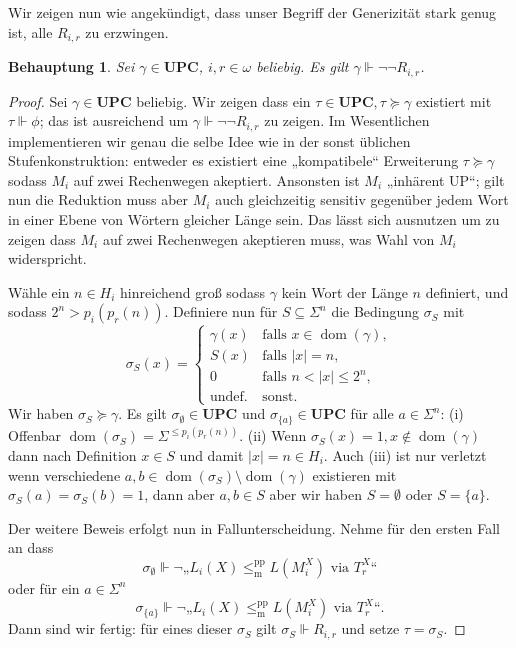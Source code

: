\documentclass[nofonts]{uebung}
\newtheorem{claim}[theorem]{Behauptung}
\theoremstyle{definition}
\DeclareMathOperator{\dom}{dom}
\def\leqmpp{\ensuremath{\leq_\mathrm{m}^\mathrm{pp}}}
\begin{document}
Wir zeigen nun wie angekündigt, dass unser Begriff der Generizität stark genug ist, alle $R_{i,r}$ zu erzwingen.
\begin{claim}\label{claim:upc-stark-genug}
    Sei $\gamma\in\mathbf{UPC}$, $i,r\in\omega$ beliebig. Es gilt $\gamma\Vdash\neg\neg   R_{i,r}$.
\end{claim}
\begin{proof}
    Sei $\gamma\in\mathbf{UPC}$ beliebig. Wir zeigen dass ein $\tau\in\mathbf{UPC}, \tau\succeq \gamma$ existiert mit $\tau\Vdash\phi$;
    das ist ausreichend um $\gamma\Vdash\neg\neg   R_{i,r}$ zu zeigen.
    Im Wesentlichen implementieren wir genau die selbe Idee wie in der sonst üblichen Stufenkonstruktion: entweder es existiert eine „kompatibele“ Erweiterung $\tau\succeq \gamma$ sodass $M_i$ auf zwei Rechenwegen akeptiert. Ansonsten ist $M_i$ „inhärent UP“; gilt nun die Reduktion muss aber $M_i$ auch gleichzeitig sensitiv gegenüber jedem Wort in einer Ebene von Wörtern gleicher Länge sein. Das lässt sich ausnutzen um zu zeigen dass $M_i$ auf zwei Rechenwegen akeptieren muss, was Wahl von $M_i$ widerspricht.

    Wähle ein $n\in H_i$ hinreichend groß sodass $\gamma$ kein Wort der Länge $n$ definiert,
    und sodass $2^n>p_i(p_r(n))$.
    Definiere nun für $S\subseteq\Sigma^n$ die Bedingung $\sigma_S$ mit
    \[ \sigma_S(x)  =\begin{cases}
    \gamma(x) & \text{falls $x\in\dom(\gamma)$},\\
    S(x) & \text{falls $|x|=n$},\\
    0 & \text{falls $n<|x|\leq 2^n$},\\
    \text{undef.} & \text{sonst}.
    \end{cases}
    \]
    Wir haben $\sigma_S\succeq \gamma$.
    Es gilt $\sigma_\emptyset\in\mathbf{UPC}$ und $\sigma_{\{a\}}\in\mathbf{UPC}$ für alle $a\in \Sigma^n$:
    (i) Offenbar $\dom(\sigma_S)=\Sigma^{\leq p_i(p_r(n))}$.
    (ii) Wenn $\sigma_S(x)=1,x\not\in\dom(\gamma)$ dann nach Definition $x\in S$ und damit $|x|=n\in H_i$.
    Auch (iii) ist nur verletzt wenn verschiedene $a,b\in\dom(\sigma_S)\setminus\dom(\gamma)$ existieren mit $\sigma_S(a)=\sigma_S(b)=1$, dann aber $a,b\in S$ aber wir haben $S=\emptyset$ oder $S=\{a\}$.

    Der weitere Beweis erfolgt nun in Fallunterscheidung. Nehme für den ersten Fall an dass
    \[ \sigma_\emptyset \Vdash \neg„L_{i}(X)\leqmpp L(M_i^X)\text{ via }T^X_r“ \]
    oder für ein $a\in\Sigma^n$
    \[ \sigma_{\{a\}} \Vdash \neg„L_{i}(X)\leqmpp L(M_i^X)\text{ via }T^X_r“. \]
    Dann sind wir fertig: für eines dieser $\sigma_S$ gilt $\sigma_S\Vdash   R_{i,r}$ und setze $\tau=\sigma_S$.


\end{proof}
\end{document}
